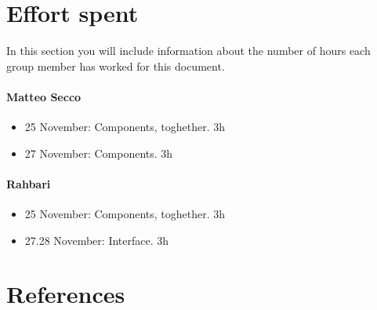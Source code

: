 \documentclass{article}
\begin{document}
\section{Effort spent}In	 this	 section	you	will	include	information	about	 the	number	of	hours	each	
group	member	has	worked	for	this	document.
	\paragraph{Matteo Secco}
		\begin{itemize}
			\item 25 November: Components, toghether. 3h
			\item 27 November: Components. 3h
		\end{itemize}
	\paragraph{Rahbari}
		\begin{itemize}
			\item 25 November: Components, toghether. 3h
			\item 27.28 November: Interface. 3h
		\end{itemize}
\section{References}
\end{document}
